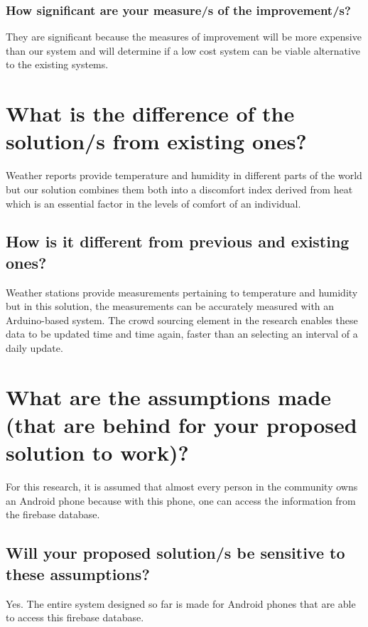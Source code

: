 \subsubsection{How significant are your measure/s of the improvement/s?}

They are significant because the measures of improvement will be more expensive than our system and will determine if a low cost system can be viable alternative to the existing systems.


\section{What is the difference of the solution/s from existing ones?}
	
Weather reports provide temperature and humidity in different parts of the world but our solution combines them both into a discomfort index derived from heat which is an essential factor in the levels of comfort of an individual.

\subsection{How is it different from previous and existing ones?}

Weather stations provide measurements pertaining to temperature and humidity but in this solution, the measurements can be accurately measured with an Arduino-based system. The crowd sourcing element in the research enables these data to be updated time and time again, faster than an selecting an interval of a daily update.

	
\section{What are the assumptions made (that are behind for your proposed solution to work)?}
	
For this research, it is assumed that almost every person in the community owns an Android phone because with this phone, one can access the information from the firebase database.
		
	
\subsection{Will your proposed solution/s be sensitive to these assumptions?}
	
Yes. The entire system designed so far is made for Android phones that are able to access this firebase database.

